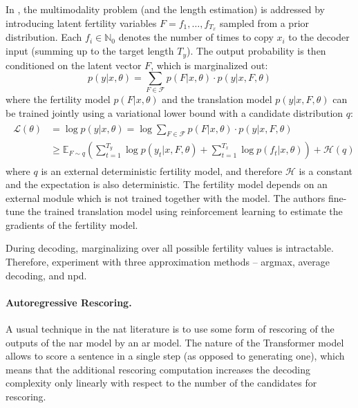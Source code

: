 In \citet{gu2017nonautoregressive}, the multimodality problem (and the length
estimation) is addressed by introducing latent fertility variables
$F = f_1, \ldots, f_{T_x}$ sampled from a prior distribution. Each
$f_i \in \mathbb{N}_0$ denotes the number of times to copy $x_i$ to the decoder
input (summing up to the target length $T_y$). The output probability is then
conditioned on the latent vector $F$, which is marginalized out:
%
\begin{equation}
  p(y|x, \theta) = \sum_{F \in \mathcal{F}} p(F|x, \theta) \cdot p(y|x, F, \theta)
\end{equation}
%
where the fertility model $p(F|x, \theta)$ and the translation model
$p(y|x, F, \theta)$ can be trained jointly using a variational lower bound with
a candidate distribution $q$:
\begin{align}
  \begin{split}
    \mathcal{L}(\theta)
    & = \log p(y|x, \theta) = \log \sum_{F \in \mathcal{F}} p(F| x, \theta ) \cdot p(y | x, F, \theta) \\
    & \geq \mathbb{E}_{F \sim q} \left(\sum_{t=1}^{T_y} \log p(y_t | x, F, \theta)
      + \sum_{t=1}^{T_x} \log p(f_t | x, \theta) \right) + \mathcal{H}(q)
  \end{split}
\end{align}
%
where $q$ is an external deterministic fertility model, and therefore
$\mathcal{H}$ is a constant and the expectation is also deterministic. 
%
The fertility model depends on an external module which is not trained together
with the model. The authors fine-tune the trained translation model using
reinforcement learning \citep{williams1992simple} to estimate the gradients of
the fertility model.

During decoding, marginalizing over all possible fertility values is
intractable. Therefore, \citet{gu2017nonautoregressive} experiment with three
approximation methods -- argmax, average decoding, and \ac{npd}.  

\paragraph{Autoregressive Rescoring.} A usual technique in the \ac{nat}
literature is to use some form of rescoring of the outputs of the \acl{nar}
model by an \acl{ar} model. The nature of the Transformer model allows to score
a sentence in a single step (as opposed to generating one), which means that
the additional rescoring computation increases the decoding complexity only
linearly with respect to the number of the candidates for rescoring.

